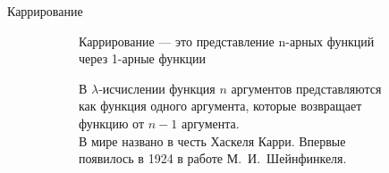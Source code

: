 \begin{frame}{Каррирование}
\begin{figure}[t]
  \begin{subfigure}[t]{0.6\textwidth}
        \vspace{-10em}
\begin{definition}{Каррирование}
  --- это представление n-арных функций через 1-арные функции
\end{definition}

\vspace{1em}

В $\lambda$-исчислении функция $n$ аргументов представляются как функция одного аргумента, которые возвращает функцию от $n-1$ аргумента.\\

В мире названо в честь Хаскеля Карри. Впервые появилось в 1924 в работе М.~И.~Шейнфинкеля.\\



\end{subfigure}
\end{figure}
\end{frame}
